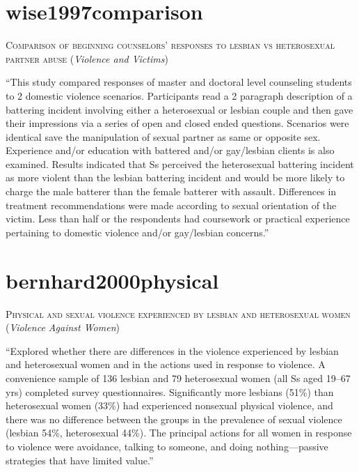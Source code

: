 \documentclass[]{tufte-handout}
\begin{document}
\section{\texorpdfstring{\textcolor[HTML]{5b0057}{wise1997comparison}}{}}\label{section-24}

\textsc{\large{Comparison of beginning counselors' responses to lesbian vs heterosexual partner abuse}}
(\emph{Violence and Victims})

``This study compared responses of master and doctoral level counseling
students to 2 domestic violence scenarios. Participants read a 2
paragraph description of a battering incident involving either a
heterosexual or lesbian couple and then gave their impressions via a
series of open and closed ended questions. Scenarios were identical save
the manipulation of sexual partner as same or opposite sex. Experience
and/or education with battered and/or gay/lesbian clients is also
examined. Results indicated that Ss perceived the heterosexual battering
incident as more violent than the lesbian battering incident and would
be more likely to charge the male batterer than the female batterer with
assault. Differences in treatment recommendations were made according to
sexual orientation of the victim. Less than half or the respondents had
coursework or practical experience pertaining to domestic violence
and/or gay/lesbian concerns.''

\section{\texorpdfstring{\textcolor[HTML]{5b0057}{bernhard2000physical}}{}}\label{section-25}

\textsc{\large{Physical and sexual violence experienced by lesbian and heterosexual women}}
(\emph{Violence Against Women})

``Explored whether there are differences in the violence experienced by
lesbian and heterosexual women and in the actions used in response to
violence. A convenience sample of 136 lesbian and 79 heterosexual women
(all Ss aged 19--67 yrs) completed survey questionnaires. Significantly
more lesbians (51\%) than heterosexual women (33\%) had experienced
nonsexual physical violence, and there was no difference between the
groups in the prevalence of sexual violence (lesbian 54\%, heterosexual
44\%). The principal actions for all women in response to violence were
avoidance, talking to someone, and doing nothing---passive strategies
that have limited value.''
\end{document}
